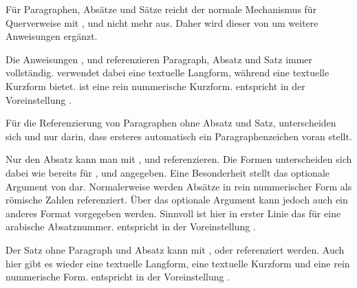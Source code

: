 Für Paragraphen, Absätze und Sätze reicht der normale Mechanismus für
Querverweise mit ,
 und  nicht mehr aus. Daher wird dieser von
 um weitere Anweisungen ergänzt.

\begin{Declaration}
\end{Declaration}
Die Anweisungen ,  und 
referenzieren Paragraph, Absatz und Satz immer vollständig. 
verwendet dabei eine textuelle Langform, während  eine textuelle
Kurzform bietet.  ist eine rein nummerische Kurzform. 
entspricht in der Voreinstellung .%
\EndIndexGroup


\begin{Declaration}
\end{Declaration}
Für die Referenzierung von Paragraphen ohne Absatz und Satz, unterscheiden
sich  und  nur darin, dass ersteres
automatisch ein Paragraphenzeichen voran stellt.%
\EndIndexGroup


\begin{Declaration}
\end{Declaration}
Nur den Absatz kann man mit ,  und
 referenzieren. Die Formen unterscheiden sich dabei wie bereits
für ,  und
 angegeben. Eine Besonderheit stellt das
optionale Argument von  dar. Normalerweise werden Absätze in
rein nummerischer Form als römische Zahlen referenziert. Über das optionale
Argument kann jedoch auch ein anderes Format vorgegeben werden. Sinnvoll ist
hier in erster Linie das   für eine
arabische Absatznummer.  entspricht in der Voreinstellung
.
\EndIndexGroup


\begin{Declaration}
\end{Declaration}
Der Satz ohne Paragraph und Absatz kann mit ,
 oder  referenziert werden. Auch hier
gibt es wieder eine textuelle Langform, eine textuelle Kurzform und eine rein
nummerische Form.  entspricht in der Voreinstellung
.%
\EndIndexGroup


